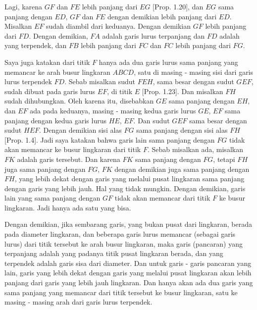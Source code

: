 \documentclass[a4paper]{book}
\begin{document}
Lagi, karena $GF$ dan $FE$ lebih panjang dari $EG$ [Prop. 1.20], dan $EG$ sama
panjang dengan $ED$, $GF$ dan $FE$ dengan demikian lebih panjang dari $ED$.
Misalkan $EF$ sudah diambil dari keduanya. Dengan demikian $GF$ lebih panjang
dari $FD$. Dengan demikian, $FA$ adalah garis lurus terpanjang dan $FD$ adalah
yang terpendek, dan $FB$ lebih panjang dari $FC$ dan $FC$ lebih panjang dari 
$FG$.

Saya juga katakan dari titik $F$ hanya ada dua garis lurus sama panjang
yang memancar ke arah busur lingkaran $ABCD$, satu di masing - masing sisi
dari garis lurus terpendek $FD$. Sebab misalkan sudut $FEH$, sama besar dengan
sudut $GEF$, sudah dibuat pada garis lurus $EF$, di titik $E$ [Prop. 1.23]. 
Dan misalkan $FH$ sudah dihubungkan. Oleh karena itu, disebabkan $GE$ sama 
panjang dengan $EH$, dan $EF$ ada pada keduanya, masing - masing kedua garis 
lurus $GE$, $EF$ sama panjang dengan kedua garis lurus $HE$, $EF$. Dan sudut 
$GEF$ sama besar dengan sudut $HEF$. Dengan demikian sisi alas $FG$ sama 
panjang  dengan sisi alas $FH$ [Prop. 1.4]. Jadi saya katakan bahwa garis lain
sama panjang dengan $FG$ tidak akan  memancar ke busur lingkaran dari titik 
$F$. Sebab misalkan ada, misalkan $FK$ adalah garis tersebut. Dan karena $FK$
sama panjang dengan $FG$, tetapi $FH$ juga sama panjang dengan $FG$, $FK$ 
dengan demikian juga sama panjang dengan $FH$, yang lebih dekat dengan garis
yang melalui pusat lingkaran sama panjang dengan garis yang lebih jauh. Hal
yang tidak mungkin. Dengan demikian, garis lain yang sama panjang dengan $GF$
tidak akan memancar dari titik $F$ ke busur lingkaran. Jadi hanya ada satu
yang bisa.

Dengan demikian, jika sembarang garis, yang bukan pusat dari lingkaran, 
berada pada diameter lingkaran, dan beberapa garis lurus memancar 
(sebagai garis lurus) dari titik tersebut ke arah busur lingkaran, 
maka garis (pancaran) yang terpanjang adalah 
yang padanya titik pusat lingkaran berada, dan yang terpendek adalah garis sisa dari diameter. Dan untuk garis - garis 
pancaran yang lain, garis yang 
lebih dekat 
dengan garis yang melalui pusat lingkaran akan 
lebih panjang dari garis yang lebih jauh lingkaran. Dan hanya akan ada dua 
garis yang sama panjang yang memancar dari titik tersebut ke busur lingkaran, 
satu ke masing - masing arah dari garis lurus terpendek.  

\end{document}
